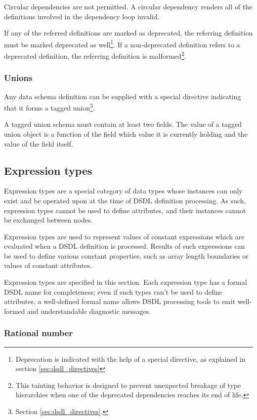 Circular dependencies are not permitted.
A circular dependency renders all of the definitions involved in the dependency loop invalid.

If any of the referred definitions are marked as deprecated,
the referring definition must be marked deprecated as well\footnote{%
Deprecation is indicated with the help of a special directive, as explained in section \ref{sec:dsdl_directives}}.
If a non-deprecated definition refers to a deprecated definition,
the referring definition is malformed\footnote{%
This tainting behavior is designed to prevent unexpected breakage of
type hierarchies when one of the deprecated dependencies reaches its end of life.}.

\subsubsection{Unions}

Any data schema definition can be supplied with a special directive indicating that
it forms a tagged union\footnote{Section \ref{sec:dsdl_directives}.}.

A tagged union schema must contain at least two fields.
The value of a tagged union object is a function of the field which value it is currently holding
and the value of the field itself.

\subsection{Expression types}

Expression types are a special category of data types whose instances can only exist and be operated upon
at the time of DSDL definition processing.
As such, expression types cannot be used to define attributes,
and their instances cannot be exchanged between nodes.

Expression types are used to represent values of constant expressions which are evaluated
when a DSDL definition is processed.
Results of such expressions can be used to define various constant properties,
such as array length boundaries or values of constant attributes.

Expression types are specified in this section.
Each expression type has a formal DSDL name for completeness;
even if such types can't be used to define attributes,
a well-defined formal name allows DSDL processing tools to emit well-formed
and understandable diagnostic messages.

\subsubsection{Rational number}

